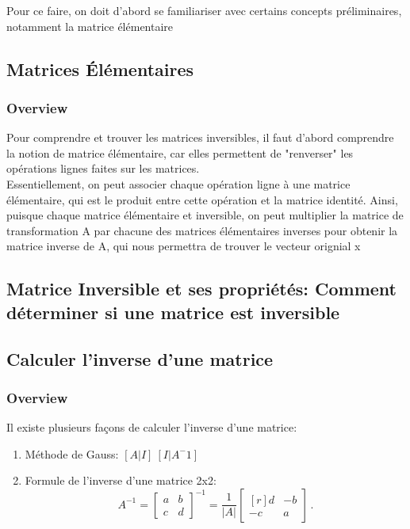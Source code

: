 \documentclass{article}
\begin{document}
Pour ce faire, on doit d'abord se familiariser avec certains concepts
préliminaires, notamment la matrice élémentaire

\subsection{Matrices Élémentaires}%
\label{sub:Matrices Élémentaires}

\subsubsection{Overview}%
\label{ssub:Overview}

Pour comprendre et trouver les matrices inversibles, il faut d'abord comprendre
la notion de matrice élémentaire, car elles permettent de "renverser" les
opérations lignes faites sur les matrices.\\

Essentiellement, on peut associer chaque opération ligne à une matrice
élémentaire, qui est le produit entre cette opération et la matrice identité.
Ainsi, puisque chaque matrice élémentaire et inversible, on peut multiplier
la matrice de transformation A par chacune des matrices élémentaires inverses
pour obtenir la matrice inverse de A, qui nous permettra de trouver le
vecteur orignial x

\subsection{Matrice Inversible et ses propriétés: Comment déterminer si une
matrice est inversible}%
\label{sub:Matrice Inversible et ses propriétés}

\subsection{Calculer l'inverse d'une matrice}%
\label{sub:Calculer l'inverse d'une matrice}

\subsubsection{Overview}%
\label{ssub:Overview}

Il existe plusieurs façons de calculer l'inverse d'une matrice:
\begin{enumerate}
    \item Méthode de Gauss: $ [A|I] ~ [I| A^-1] $
    \item Formule de l'inverse d'une matrice 2x2:
	$$
	A^{-1}=\begin{bmatrix}
	    a & b \\
	    c & d
	\end{bmatrix}^{-1}
	=\frac{1}{\lvert A\rvert}
	\begin{bmatrix*}[r]
	    d & -b \\
	    -c & a
	\end{bmatrix*} \,.
	    $$

\end{enumerate}
\end{document}
